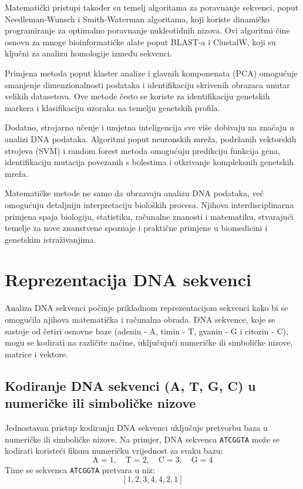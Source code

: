 \documentclass[10pt,a4paper,twoside]{article}
\begin{document}
Matematički pristupi također su temelj algoritama za poravnanje sekvenci, poput Needleman-Wunsch i Smith-Waterman algoritama, koji koriste dinamičko programiranje za optimalno poravnanje nukleotidnih nizova. Ovi algoritmi čine osnovu za mnoge bioinformatičke alate poput BLAST-a i ClustalW, koji su ključni za analizu homologije između sekvenci.

Primjena metoda poput klaster analize i glavnih komponenata (PCA) omogućuje smanjenje dimenzionalnosti podataka i identifikaciju skrivenih obrazaca unutar velikih datasetova. Ove metode često se koriste za identifikaciju genetskih markera i klasifikaciju uzoraka na temelju genetskih profila.

Dodatno, strojarno učenje i umjetna inteligencija sve više dobivaju na značaju u analizi DNA podataka. Algoritmi poput neuronskih mreža, podržanih vektorskih strojeva (SVM) i random forest metoda omogućuju predikciju funkcija gena, identifikaciju mutacija povezanih s bolestima i otkrivanje kompleksnih genetskih mreža.

Matematičke metode ne samo da ubrzavaju analizu DNA podataka, već omogućuju detaljniju interpretaciju bioloških procesa. Njihova interdisciplinarna primjena spaja biologiju, statistiku, računalne znanosti i matematiku, stvarajući temelje za nove znanstvene spoznaje i praktične primjene u biomedicini i genetskim istraživanjima.
	
\section*{Reprezentacija DNA sekvenci}

Analiza DNA sekvenci počinje prikladnom reprezentacijom sekvenci kako bi se omogućila njihova matematička i računalna obrada. DNA sekvence, koje se sastoje od četiri osnovne baze (adenin - A, timin - T, gvanin - G i citozin - C), mogu se kodirati na različite načine, uključujući numeričke ili simboličke nizove, matrice i vektore.

\subsection*{Kodiranje DNA sekvenci (A, T, G, C) u numeričke ili simboličke nizove}

Jednostavan pristup kodiranju DNA sekvenci uključuje pretvorbu baza u numeričke ili simboličke nizove. Na primjer, DNA sekvenca \texttt{ATCGGTA} može se kodirati koristeći fiksnu numeričku vrijednost za svaku bazu:
\[
\text{A} = 1, \quad \text{T} = 2, \quad \text{C} = 3, \quad \text{G} = 4
\]
Time se sekvenca \texttt{ATCGGTA} pretvara u niz:
\[
[1, 2, 3, 4, 4, 2, 1]
\]
\end{document}
